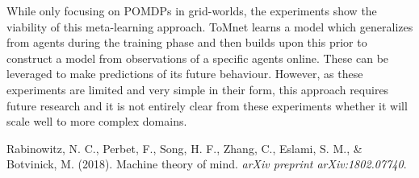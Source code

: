 \documentclass[12pt]{article}
\begin{document}
While only focusing on POMDPs in grid-worlds, the experiments show the viability of this meta-learning approach. ToMnet learns a model which generalizes from agents during the training phase and then builds upon this prior to construct a model from observations of a specific agents online. These can be leveraged to make predictions of its future behaviour. However, as these experiments are limited and very simple in their form, this approach requires future research and it is not entirely clear from these experiments whether it will scale well to more complex domains.

\begin{thebibliography}{9}
Rabinowitz, N. C., Perbet, F., Song, H. F., Zhang, C., Eslami, S. M., & Botvinick, M. (2018). Machine theory of mind. \emph{arXiv preprint arXiv:1802.07740}.

\end{thebibliography}
 
\end{document}
